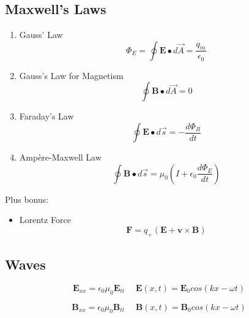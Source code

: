 \documentclass[twocolumn, 12pt]{article}
\begin{document}
\subsection*{Maxwell's Laws}
\begin{enumerate}
    \item Gauss' Law
        \begin{equation*}
            \Phi_E = \oint \textbf{E} \bullet d\vec{A} = \frac{q_{in}}{\epsilon_0}
        \end{equation*}
    \item Gauss's Law for Magnetism
        \begin{equation*}
            \oint \textbf{B} \bullet d\vec{A} = 0
        \end{equation*}
    \item Faraday's Law
        \begin{equation*}
            \oint \textbf{E} \bullet d\vec{s} = -\frac{d \Phi_B}{dt}
        \end{equation*}
    \item Ampère-Maxwell Law 
        \begin{equation*}
            \oint \textbf{B} \bullet d\vec{s} = \mu_0 \left(I + \epsilon_0 \frac{d\Phi_E}{dt}  \right)
        \end{equation*}
\end{enumerate}
Plus bonus: 
\begin{itemize}
    \item Lorentz Force
        \begin{equation*}
            \textbf{F} = q_+(\textbf{E} +\textbf{v} \times \textbf{B})
        \end{equation*}
\end{itemize}





\subsection*{Waves}
\begin{equation*}
    \textbf{E}_{xx}= \epsilon_0 \mu_0 \textbf{E}_{tt} \hspace{15pt} \textbf{E}(x,t) = \textbf{E}_0 cos (kx-\omega t)
\end{equation*}


\begin{equation*}
    \textbf{B}_{xx} = \epsilon_0 \mu _0 \textbf{B}_{tt} \hspace{15pt} \textbf{B}(x,t) = \textbf{B}_0 cos (kx- \omega t)
\end{equation*}
\end{document}
